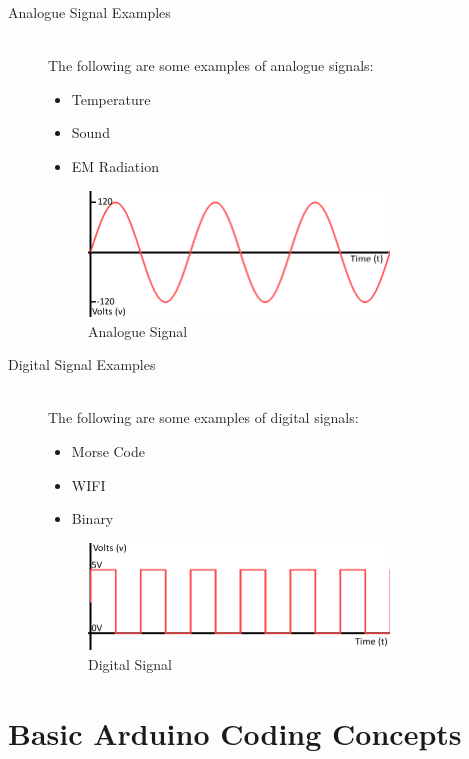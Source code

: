 \begin{description}
	\item[Analogue Signal Examples] \hfill \\
	The following are some examples of analogue signals:
	\begin{itemize}
		\item Temperature
		\item Sound
		\item EM Radiation
	\end{itemize}
	\begin{figure}[ht]
		\centering
		\includegraphics[width=8cm]{images/05}
		\caption{Analogue Signal \citep{sparkfun-15}}
		\label{fig:analogue_signal}
	\end{figure}
	
	\item[Digital Signal Examples] \hfill \\
	The following are some examples of digital signals:
	\begin{itemize}
		\item Morse Code
		\item WIFI
		\item Binary
	\end{itemize}
	\begin{figure}[ht]
		\centering
		\includegraphics[width=8cm]{images/06}
		\caption{Digital Signal \citep{sparkfun-15}}
		\label{fig:digital_signal}
	\end{figure}
\end{description}






\newpage
\section*{Basic Arduino Coding Concepts}



